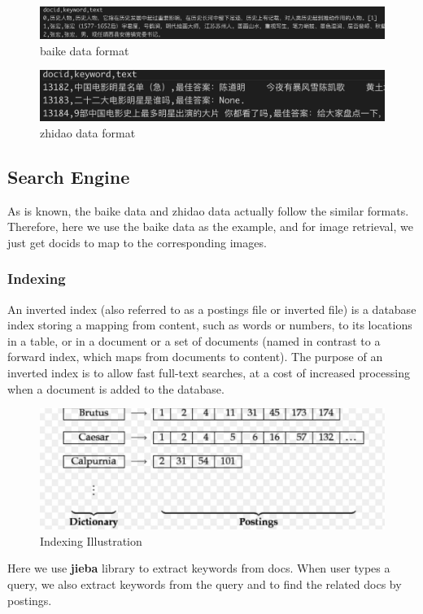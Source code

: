 \documentclass[10pt,times,twocolumn]{article}
\begin{document}
\begin{figure}[ht]
\centering
\includegraphics[scale=0.1]{fig/3}
\caption{baike data format}
\label{fig:label}
\end{figure}
\begin{figure}[ht]
\centering
\includegraphics[scale=0.3]{fig/4}
\caption{zhidao data format}
\label{fig:label}
\end{figure}


\subsection{Search Engine}
As is known, the baike data and zhidao data actually follow the similar formats. Therefore, 
here we use the baike data as the example, and for image retrieval, we just get docids to map to the corresponding images.

\subsubsection{Indexing}
An inverted index (also referred to as a postings file or inverted file) is a database index storing a mapping from content, such as words or numbers, to its locations in a table, or in a document or a set of documents (named in contrast to a forward index, which maps from documents to content). The purpose of an inverted index is to allow fast full-text searches, at a cost of increased processing when a document is added to the database. 
\begin{figure}[ht]
\centering
\includegraphics[scale=0.2]{fig/5}
\caption{Indexing Illustration}
\label{fig:label}
\end{figure}
\newline
Here we use \textbf{jieba} library to extract keywords from docs. When user types a query, 
we also extract keywords from the query and to find the related docs by postings.
\end{document}
